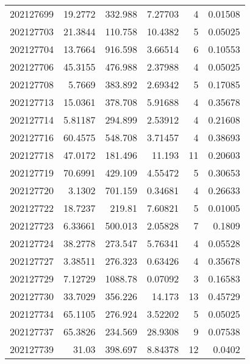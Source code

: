 \begin{tabular}{rrrrrr}
 202127699 &         19.2772  &      332.988  &            7.27703 &           4 & 0.01508 \\
 202127703 &         21.3844  &      110.758  &           10.4382  &           5 & 0.05025 \\
 202127704 &         13.7664  &      916.598  &            3.66514 &           6 & 0.10553 \\
 202127706 &         45.3155  &      476.988  &            2.37988 &           4 & 0.05025 \\
 202127708 &          5.7669  &      383.892  &            2.69342 &           5 & 0.17085 \\
 202127713 &         15.0361  &      378.708  &            5.91688 &           4 & 0.35678 \\
 202127714 &          5.81187 &      294.899  &            2.53912 &           4 & 0.21608 \\
 202127716 &         60.4575  &      548.708  &            3.71457 &           4 & 0.38693 \\
 202127718 &         47.0172  &      181.496  &           11.193   &          11 & 0.20603 \\
 202127719 &         70.6991  &      429.109  &            4.55472 &           5 & 0.30653 \\
 202127720 &          3.1302  &      701.159  &            0.34681 &           4 & 0.26633 \\
 202127722 &         18.7237  &      219.81   &            7.60821 &           5 & 0.01005 \\
 202127723 &          6.33661 &      500.013  &            2.05828 &           7 & 0.1809  \\
 202127724 &         38.2778  &      273.547  &            5.76341 &           4 & 0.05528 \\
 202127727 &          3.38511 &      276.323  &            0.63426 &           4 & 0.35678 \\
 202127729 &          7.12729 &     1088.78   &            0.07092 &           3 & 0.16583 \\
 202127730 &         33.7029  &      356.226  &           14.173   &          13 & 0.45729 \\
 202127734 &         65.1105  &      276.924  &            3.52202 &           5 & 0.05025 \\
 202127737 &         65.3826  &      234.569  &           28.9308  &           9 & 0.07538 \\
 202127739 &         31.03    &      398.697  &            8.84378 &          12 & 0.0402  \\

\end{tabular}
